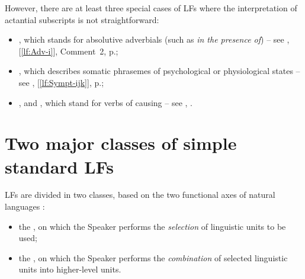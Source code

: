 \endgroup

However, there are at least three special cases of LFs where the interpretation of actantial subscripts is not straightforward:
 
 \begin{itemize}
 
 \item {}, which stands for absolutive adverbials (such as \textit{in the presence of}) -- see , [\ref{lf:Adv-i}], Comment~2, p.\thinspace\pageref{para:comment2Advi};
 
 \item {}, which describes somatic phrasemes of psychological or physiological states -- see , [\ref{lf:Sympt-ijk}], p.\thinspace\pageref{lf:Sympt-ijk};

\item {},  and , which stand for verbs of causing -- see , .
 
 \end{itemize}

\section{Two major classes of simple standard LFs}\label{sec:LFParaSynt}

LFs are divided in two classes, based on the two functional axes of natural languages \parencite[Part~2, Ch.~V]{Saussure1972}:

\begin{itemize}

\item the , on which the Speaker performs the \emph{selection} of linguistic units to be used;

\item the , on which the Speaker performs the \emph{combination} of selected linguistic units into higher-level units.

\end{itemize}


